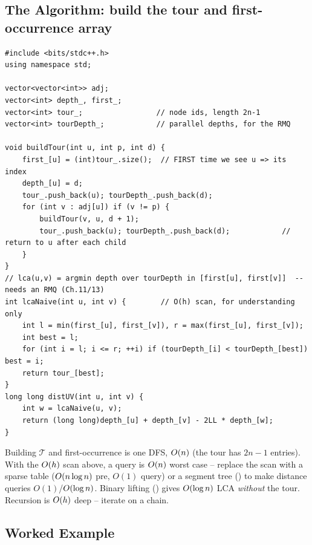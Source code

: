 \subsection{The Algorithm: build the tour and first-occurrence array}

\begin{lstlisting}[caption={The 2n-1 Euler tour, first-occurrence, and distance via LCA}, label={lst:c24-tour-build}]
#include <bits/stdc++.h>
using namespace std;

vector<vector<int>> adj;
vector<int> depth_, first_;
vector<int> tour_;                 // node ids, length 2n-1
vector<int> tourDepth_;            // parallel depths, for the RMQ

void buildTour(int u, int p, int d) {
    first_[u] = (int)tour_.size();  // FIRST time we see u => its index
    depth_[u] = d;
    tour_.push_back(u); tourDepth_.push_back(d);
    for (int v : adj[u]) if (v != p) {
        buildTour(v, u, d + 1);
        tour_.push_back(u); tourDepth_.push_back(d);            // return to u after each child
    }
}
// lca(u,v) = argmin depth over tourDepth in [first[u], first[v]]  -- needs an RMQ (Ch.11/13)
int lcaNaive(int u, int v) {        // O(h) scan, for understanding only
    int l = min(first_[u], first_[v]), r = max(first_[u], first_[v]);
    int best = l;
    for (int i = l; i <= r; ++i) if (tourDepth_[i] < tourDepth_[best]) best = i;
    return tour_[best];
}
long long distUV(int u, int v) {
    int w = lcaNaive(u, v);
    return (long long)depth_[u] + depth_[v] - 2LL * depth_[w];
}
\end{lstlisting}
\begin{complexitybox}
Building $\mathcal{T}$ and first-occurrence is one DFS, $O(n)$ (the tour has $2n-1$
entries). With the $O(h)$ scan above, a query is $O(n)$ worst case -- replace the
scan with a sparse table ($O(n\log n)$ pre, $O(1)$ query) or a segment tree
() to make distance queries $O(1)$/$O(\log n)$. Binary lifting
() gives $O(\log n)$ LCA \emph{without} the tour. Recursion is $O(h)$
deep -- iterate on a chain.
\end{complexitybox}

\subsection{Worked Example}


